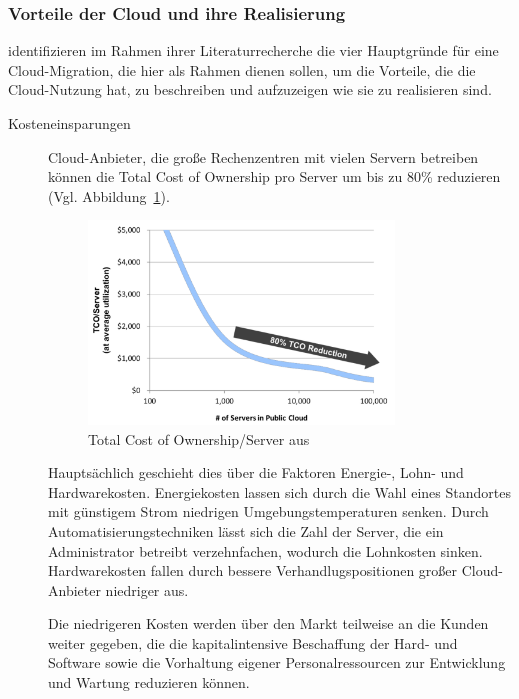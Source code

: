 \subsubsection{Vorteile der Cloud und ihre Realisierung}
\label{cha:vorteile_der_cloud}
 identifizieren im Rahmen ihrer
Literaturrecherche die vier Hauptgründe für eine Cloud-Migration, die hier als
Rahmen dienen sollen, um die Vorteile, die die Cloud-Nutzung hat, zu
beschreiben und aufzuzeigen wie sie zu realisieren sind.
\begin{description}
	\item[Kosteneinsparungen] Cloud-Anbieter, die große Rechenzentren
mit vielen Servern betreiben können die Total Cost of Ownership pro Server um
bis zu 80\% reduzieren (Vgl. Abbildung~\ref{fig:tco_reduction}).
\begin{figure}[!h]
\begin{center}
\includegraphics[width=0.8\textwidth]{images/tco_reduction.png}
\caption{Total Cost of Ownership/Server
aus \protect{}}
\label{fig:tco_reduction}
\end{center}
\end{figure}
 Hauptsächlich geschieht dies über die Faktoren Energie-, Lohn- und
Hardwarekosten. Energiekosten lassen sich durch die Wahl eines Standortes
mit günstigem Strom niedrigen Umgebungstemperaturen senken. Durch
Automatisierungstechniken lässt sich die Zahl der Server, die ein Administrator
betreibt verzehnfachen, wodurch die Lohnkosten sinken. Hardwarekosten fallen
durch bessere Verhandlugspositionen großer Cloud-Anbieter niedriger aus.

Die niedrigeren Kosten werden über den Markt teilweise an die Kunden weiter
gegeben, die die kapitalintensive Beschaffung der Hard- und Software sowie die
Vorhaltung eigener Personalressourcen zur Entwicklung und Wartung reduzieren
können. 


\end{description}
